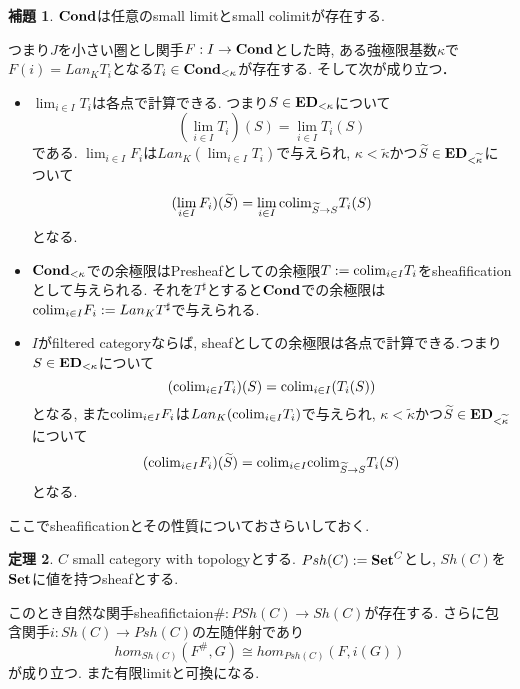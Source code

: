 \documentclass[dvipdfmx,a4paper,11pt]{report}
\newcommand{\colim}{{\rm colim}}
\theoremstyle{definition}
\newtheorem{thm}{定理}
\newtheorem{lem}[thm]{補題}
\newcommand{\xr}[1]{\textcolor{red}{#1}}
\begin{document}
\begin{tcolorbox}
 [colback = white, colframe = green!35!black, fonttitle = \bfseries,breakable = true]
\begin{lem}\cite[Remark 2.13]{Sch19}
\label{cor-Sch19-rem2.13}
${\bf Cond}$は任意のsmall limitとsmall colimitが存在する.

つまり$J$を小さい圏とし関手$F : I \to {\bf Cond}$とした時, 
ある強極限基数$\kappa$で$F(i) = Lan_{K}T_i$となる$T_i \in {\bf Cond_{<\kappa}}$が存在する.
そして次が成り立つ． 
\begin{itemize}
\item $\lim_{i \in I} T_i$は各点で計算できる.
つまり$S \in { \bf ED}_{< \kappa}$について
$$(\lim_{i \in I} T_i)(S)= \lim_{i \in I} T_i(S)$$である. $\lim_{i \in I}F_i$は$Lan_{K}(\lim_{i \in I} T_i)$で与えられ, $\kappa <\widetilde{\kappa}$かつ$\widetilde{S} \in { \bf ED}_{<\widetilde{\kappa}}$について
$$
(\lim_{i \in I}F_i)(\widetilde{S})
=  \lim_{i \in I} \colim_{\widetilde{S} \to S}  T_i(S)
$$
となる. 
\item ${\bf Cond_{<\kappa}}$での余極限はPresheafとしての余極限$T:=\colim_{i \in I} T_i$をsheafificationとして与えられる. 
それを$T^{\sharp}$とすると${\bf Cond}$での余極限は
$\colim_{i \in I}F_i := Lan_{K}T^{\sharp}$で与えられる. 
\item $I$がfiltered categoryならば, sheafとしての余極限は各点で計算できる.つまり$S \in { \bf ED}_{< \kappa}$について
$$(\colim_{i \in I} T_i)(S) = \colim_{i \in I} (T_i(S))$$
となる, また$\colim_{i \in I}F_i$は$Lan_{K}(\colim_{i \in I} T_i)$で与えられ, 
$\kappa <\widetilde{\kappa}$かつ$\widetilde{S} \in { \bf ED}_{<\widetilde{\kappa}}$について
$$
(\colim_{i \in I}F_i)(\widetilde{S})
=\colim_{i \in I}\colim_{\widetilde{S} \to S}  T_i(S)
$$
となる. 
\end{itemize}
\end{lem}
 \end{tcolorbox}
 
 ここでsheafificationとその性質についておさらいしておく. 
  \begin{tcolorbox}
 [colback = white, colframe = green!35!black, fonttitle = \bfseries,breakable = true]
 \begin{thm}\cite{Sha2}
 $C$ small category with topologyとする. 
 $Psh(C) :={\bf Set}^{C}$とし, $Sh(C)$を${\bf Set}$に値を持つsheafとする.
 
 このとき自然な関手sheafifictaion$\# : PSh(C) \to Sh(C)$が存在する.
 さらに包含関手$i : Sh(C) \to Psh(C)$の左随伴射であり
 $$
hom_{Sh(C)}(F^{\#}, G) \cong hom_{Psh(C)}(F, i(G)) 
 $$
 が成り立つ. また有限limitと可換になる.
 \end{thm}
 \end{tcolorbox}
 
\end{document}
